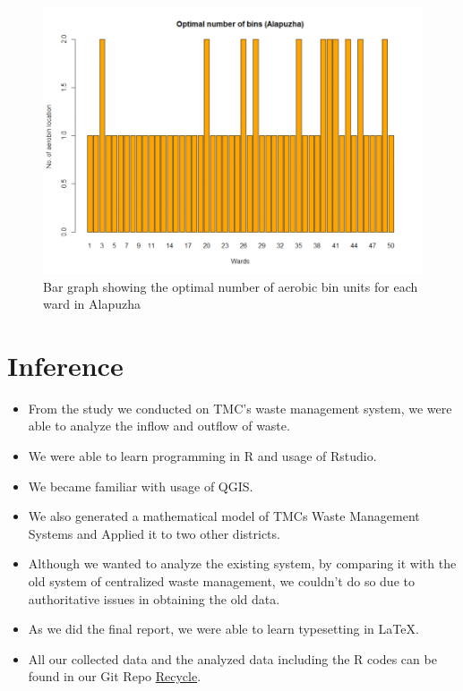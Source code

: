 \documentclass[12pt,a4paper]{report}
\begin{document}
\begin{figure}[H]
	\centering
	\includegraphics[width=0.7\linewidth]{alapuzha}
	\caption{Bar graph showing the optimal number of aerobic bin units for each ward in Alapuzha}
	\label{fig:alapuzha}
\end{figure}


\chapter{\textbf{Inference}}
\begin{itemize}
	\item From the study we conducted on TMC’s waste management system, we were able to analyze the inflow and outflow of waste.
	\item We were able to learn programming in R and usage of Rstudio.
	\item We became familiar with usage of QGIS.
	\item We also generated a mathematical model of TMCs Waste Management Systems and Applied it to two other districts.
	\item Although we wanted to analyze the existing system, by comparing it with the old system of centralized waste management, we couldn’t do so due to authoritative issues in obtaining the old data.
	\item As we did the final report, we were able to learn typesetting in LaTeX.
	\item All our collected data and the analyzed data including the R codes can be found in our Git Repo \href{https://github.com/sahridhaya/Recycle}{Recycle}.
	
\end{itemize}

\newpage
\end{document}
